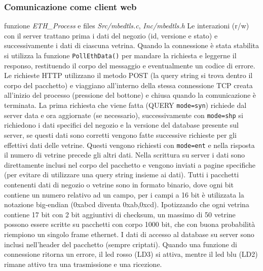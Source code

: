 \documentclass{article}
\begin{document}
\subsubsection{Comunicazione come client web}
funzione \textit{ETH\_Process} e files \textit{Src/mbedtls.c}, \textit{Inc/mbedtls.h}
Le interazioni (r/w) con il server trattano prima i dati del negozio (id, versione e stato) e successivamente i dati di ciascuna vetrina. Quando la connessione \`{e} stata stabilita si utilizza la funzione \texttt{PollEthData()} per mandare la richiesta e leggerne il responso, restituendo il corpo del messaggio e eventualmente un codice di errore. 
Le richieste HTTP utilizzano il metodo POST (la query string si trova dentro il corpo del pacchetto) e viaggiano all'interno della stessa connessione TCP creata all'inizio del processo (pressione del bottone) e chiusa quando la comunicazione \`{e} terminata. La prima richiesta che viene fatta (QUERY \texttt{mode=syn}) richiede dal server data e ora aggiornate (se necessario), successivamente con \texttt{mode=shp} si richiedono i dati specifici del negozio e la versione del database presente sul server, se questi dati sono corretti vengono fatte successive richieste per gli effettivi dati delle vetrine. Questi vengono richiesti con \texttt{mode=ent} e nella risposta il numero di vetrine precede gli altri dati. Nella scrittura su server i dati sono direttamente inclusi nel corpo del pacchetto e vengono inviati a pagine specifiche (per evitare di utilizzare una query string insieme ai dati). Tutti i pacchetti contenenti dati di negozio o vetrine sono in formato binario, dove ogni bit contiene un numero relativo ad un campo, per i campi a 16 bit \`{e} utilizzata la notazione big-endian (0xabcd diventa 0xab,0xcd). 
Ipotizzando che ogni vetrina contiene 17 bit con 2 bit aggiuntivi di checksum, un massimo di 50 vetrine possono essere scritte su pacchetti con corpo 1000 bit, che con buona probabilit\`{a} riempiono un singolo frame ethernet. I dati di accesso al database su server sono inclusi nell'header del pacchetto (sempre criptati).
Quando una funzione di connessione ritorna un errore, il led rosso (LD3) si attiva, mentre il led blu (LD2) rimane attivo tra una trasmissione e una ricezione.
\end{document}
